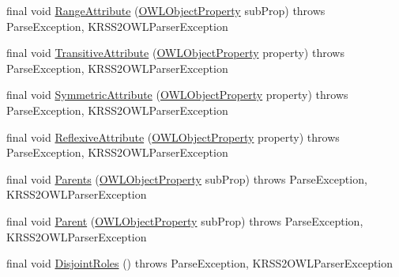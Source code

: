 \begin{DoxyCompactItemize}
\item 
final void \hyperlink{classde_1_1uulm_1_1ecs_1_1ai_1_1owlapi_1_1krssparser_1_1_k_r_s_s2_parser_a38e74ea750fc3a783659d469f3c7b1a8}{Range\-Attribute} (\hyperlink{interfaceorg_1_1semanticweb_1_1owlapi_1_1model_1_1_o_w_l_object_property}{O\-W\-L\-Object\-Property} sub\-Prop)  throws Parse\-Exception,     K\-R\-S\-S2\-O\-W\-L\-Parser\-Exception 
\item 
final void \hyperlink{classde_1_1uulm_1_1ecs_1_1ai_1_1owlapi_1_1krssparser_1_1_k_r_s_s2_parser_a7d2a9ad0eef4614e1a3437f7c77d94eb}{Transitive\-Attribute} (\hyperlink{interfaceorg_1_1semanticweb_1_1owlapi_1_1model_1_1_o_w_l_object_property}{O\-W\-L\-Object\-Property} property)  throws Parse\-Exception, K\-R\-S\-S2\-O\-W\-L\-Parser\-Exception 
\item 
final void \hyperlink{classde_1_1uulm_1_1ecs_1_1ai_1_1owlapi_1_1krssparser_1_1_k_r_s_s2_parser_a4f91ca6bbd0a25512a5f6a5321fa3976}{Symmetric\-Attribute} (\hyperlink{interfaceorg_1_1semanticweb_1_1owlapi_1_1model_1_1_o_w_l_object_property}{O\-W\-L\-Object\-Property} property)  throws Parse\-Exception, K\-R\-S\-S2\-O\-W\-L\-Parser\-Exception 
\item 
final void \hyperlink{classde_1_1uulm_1_1ecs_1_1ai_1_1owlapi_1_1krssparser_1_1_k_r_s_s2_parser_ac9f741cc92eecb58a88794eb3a4c818c}{Reflexive\-Attribute} (\hyperlink{interfaceorg_1_1semanticweb_1_1owlapi_1_1model_1_1_o_w_l_object_property}{O\-W\-L\-Object\-Property} property)  throws Parse\-Exception, K\-R\-S\-S2\-O\-W\-L\-Parser\-Exception 
\item 
final void \hyperlink{classde_1_1uulm_1_1ecs_1_1ai_1_1owlapi_1_1krssparser_1_1_k_r_s_s2_parser_ab33064abfabdf5c2b6a755d5eadf5738}{Parents} (\hyperlink{interfaceorg_1_1semanticweb_1_1owlapi_1_1model_1_1_o_w_l_object_property}{O\-W\-L\-Object\-Property} sub\-Prop)  throws Parse\-Exception,     K\-R\-S\-S2\-O\-W\-L\-Parser\-Exception 
\item 
final void \hyperlink{classde_1_1uulm_1_1ecs_1_1ai_1_1owlapi_1_1krssparser_1_1_k_r_s_s2_parser_a55e0a07ea2dcca4fa1b18be012867225}{Parent} (\hyperlink{interfaceorg_1_1semanticweb_1_1owlapi_1_1model_1_1_o_w_l_object_property}{O\-W\-L\-Object\-Property} sub\-Prop)  throws Parse\-Exception,     K\-R\-S\-S2\-O\-W\-L\-Parser\-Exception 
\item 
final void \hyperlink{classde_1_1uulm_1_1ecs_1_1ai_1_1owlapi_1_1krssparser_1_1_k_r_s_s2_parser_a30b57d7a7439df8bbdf440f09c207082}{Disjoint\-Roles} ()  throws Parse\-Exception, K\-R\-S\-S2\-O\-W\-L\-Parser\-Exception 
\item 

\end{DoxyCompactItemize}
